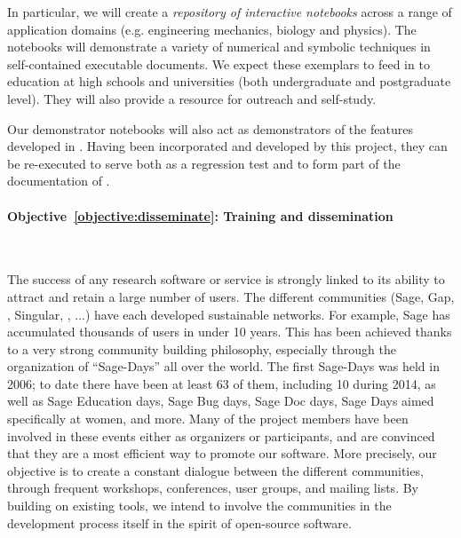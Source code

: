 \documentclass[noworkareas,deliverables,\classoptions]{euproposal}       %
\begin{document}
\begin{proposal}
In particular, we will create a \emph{repository of interactive
 notebooks} across a range of application domains (e.g. engineering
mechanics, biology and physics). The notebooks will demonstrate a
variety of numerical and symbolic techniques in self-contained
executable documents. We expect these exemplars to feed in to
education at high schools and universities (both undergraduate and
postgraduate level). They will also provide a resource for outreach
and self-study.

Our demonstrator notebooks will also act as demonstrators of the
features developed in \TheProject. Having been incorporated and
developed by this project, they can be re-executed to serve both as a
regression test and to form part of the documentation of \TheProject.



\paragraph{Objective~\ref{objective:disseminate}: Training and dissemination}\ 

The success of any research software or service is strongly linked to
its ability to attract and retain a large number of users. The
different communities (Sage, Gap, \PariGP, Singular, \Jupyter, ...)
have each developed sustainable networks. For example, Sage has
accumulated thousands of users in under 10 years. This has been
achieved thanks to a very strong community building philosophy,
especially through the organization of ``Sage-Days'' all over the
world. The first Sage-Days was held in 2006; to date there have been
at least 63 of them, including 10 during 2014, as well as Sage
Education days, Sage Bug days, Sage Doc days, Sage Days aimed
specifically at women, and more. Many of the \TheProject{} project
members have been involved in these events either as organizers or
participants, and are convinced that they are a most efficient way to
promote our software. More precisely, our objective is to create a
constant dialogue between the different communities, through frequent
workshops, conferences, user groups, and mailing lists. By building on
existing tools, we intend to involve the communities in the
development process itself in the spirit of open-source software.


\end{proposal}
\end{document}
